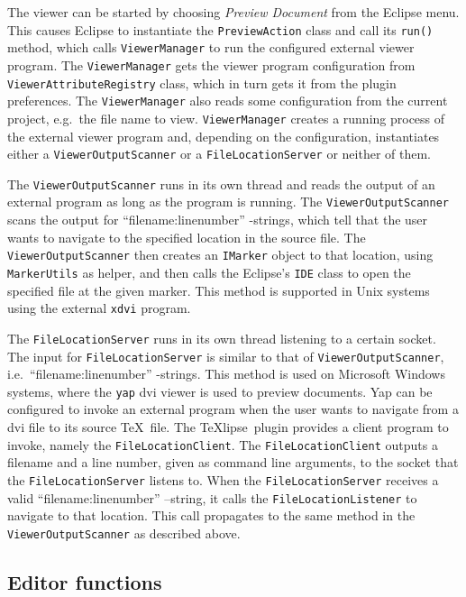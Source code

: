 \documentclass[a4paper,11pt,twoside]{article}
\newcommand{\texlipse}{\TeX lipse}
\begin{document}
The viewer can be started by choosing \emph{Preview Document} from the 
Eclipse menu. This causes Eclipse to instantiate the \texttt{PreviewAction} 
class and call its \texttt{run()} method, which calls \texttt{ViewerManager} to 
run the configured external viewer program. The \texttt{ViewerManager} gets the 
viewer program configuration from \texttt{ViewerAttributeRegistry} class, which 
in turn gets it from the plugin preferences. The \texttt{ViewerManager} also 
reads some configuration from the current project, e.g.\ the file name to view. 
\texttt{ViewerManager} creates a running process of the external viewer program 
and, depending on the configuration, instantiates either a 
\texttt{ViewerOutputScanner} or a \texttt{FileLocationServer} or neither of 
them.

The \texttt{ViewerOutputScanner} runs in its own thread and reads the output of 
an external program as long as the program is running. The 
\texttt{ViewerOutputScanner} scans the output for ``filename:linenumber'' 
-strings, which tell that the user wants to navigate to the specified location 
in the source file. The \texttt{ViewerOutputScanner} then creates an 
\texttt{IMarker} object to that location, using \texttt{MarkerUtils} as helper, 
and then calls the Eclipse's \texttt{IDE} class to open the specified file at 
the given marker. This method is supported in Unix systems using the external 
\texttt{xdvi} program.

The \texttt{FileLocationServer} runs in its own thread listening to a certain 
socket. The input for \texttt{FileLocationServer} is similar to that of 
\texttt{ViewerOutputScanner}, i.e.\ ``filename:linenumber'' -strings. This 
method is used on Microsoft Windows systems, where the \texttt{yap} dvi viewer 
is used to preview documents. Yap can be configured to invoke an external 
program when the user wants to navigate from a dvi file to its source \TeX\ 
file. The \texlipse\ plugin provides a client program to invoke, namely the 
\texttt{FileLocationClient}. The \texttt{FileLocationClient} outputs a filename 
and a line number, given as command line arguments, to the socket that the
\texttt{FileLocationServer} listens to. When the \texttt{FileLocationServer} 
receives a valid ``filename:linenumber'' --string, it calls the 
\texttt{FileLocationListener} to navigate to that location. This call 
propagates to the same method in the \texttt{ViewerOutputScanner} as described 
above.



\subsection{Editor functions}
\end{document}
